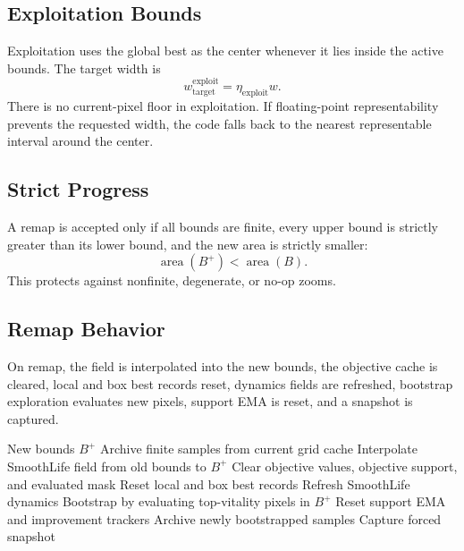\documentclass[11pt]{article}
\begin{document}
\subsection{Exploitation Bounds}

Exploitation uses the global best as the center whenever it lies inside the
active bounds. The target width is
\begin{equation}
w_{\mathrm{target}}^{\mathrm{exploit}}
= \eta_{\mathrm{exploit}}w.
\label{eq:exploit-target-width}
\end{equation}
There is no current-pixel floor in exploitation. If floating-point
representability prevents the requested width, the code falls back to the
nearest representable interval around the center.

\subsection{Strict Progress}

A remap is accepted only if all bounds are finite, every upper bound is
strictly greater than its lower bound, and the new area is strictly smaller:
\begin{equation}
\operatorname{area}(B^+) < \operatorname{area}(B).
\label{eq:strict-progress}
\end{equation}
This protects against nonfinite, degenerate, or no-op zooms.

\subsection{Remap Behavior}

On remap, the field is interpolated into the new bounds, the objective cache
is cleared, local and box best records reset, dynamics fields are refreshed,
bootstrap exploration evaluates new pixels, support EMA is reset, and a
snapshot is captured.

\begin{algorithm}
\caption{Remap and archive flow}
\begin{algorithmic}[1]
\Require New bounds $B^+$
\State Archive finite samples from current grid cache
\State Interpolate SmoothLife field from old bounds to $B^+$
\State Clear objective values, objective support, and evaluated mask
\State Reset local and box best records
\State Refresh SmoothLife dynamics
\State Bootstrap by evaluating top-vitality pixels in $B^+$
\State Reset support EMA and improvement trackers
\State Archive newly bootstrapped samples
\State Capture forced snapshot
\end{algorithmic}
\label{alg:remap}
\end{algorithm}
\end{document}
